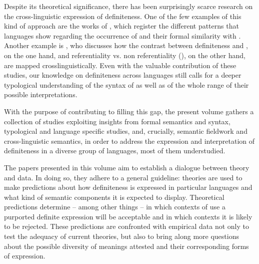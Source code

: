 \documentclass[output=paper]{langsci/langscibook}
\begin{document}
Despite its theoretical significance, there has been surprisingly scarce research on the cross-linguistic  expression of definiteness. One of the few examples of this kind of approach are the works of \citet{Dryer2005definiteart,Dryer2013,Dryer2014}, which register the different patterns that languages show regarding the occurrence of  and their formal similarity with . Another example is \citet{Givon1978}, who discusses how the contrast between definiteness and , on the one hand, and referentiality vs. non referentiality (), on the other hand, are mapped crosslinguistically. Even with the valuable contribution of these studies, our knowledge on definiteness across languages still calls for a deeper typological understanding of the syntax of  as well as of the whole range of their possible interpretations. 

With the purpose of contributing to filling this gap, the present volume gathers a collection of studies exploiting insights from formal semantics and syntax, typological and language specific studies, and, crucially, semantic fieldwork and cross-linguistic semantics, in order to address the expression and interpretation of definiteness in a diverse group of languages, most of them understudied. 

The papers presented in this volume aim to establish a dialogue between theory and data. In doing so, they adhere to a general guideline:  theories are used to make predictions about how definiteness is expressed in particular languages and what kind of semantic components it is expected to display. Theoretical predictions determine -- among other things -- in which contexts of use a purported definite expression will be acceptable and in which contexts it is likely to be rejected. These predictions are confronted with empirical data not only to test the adequacy of current theories, but also to bring along more questions about the possible diversity of meanings attested and their corresponding forms of expression. 
\end{document}
